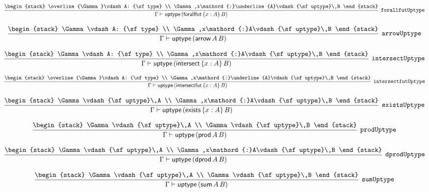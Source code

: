 \[
\infer[{\tt forallfutUptype}]{\Gamma \vdash {\sf uptype}\,({\sf forallfut}\,\{x : A\}\,B)}{
\begin{stack}
\overline{\Gamma}\vdash A: {\sf type}
\\
\Gamma ,x\mathord{:}\underline{A}\vdash {\sf uptype}\,B
\end{stack}}
\]

\[
\infer[{\tt arrowUptype}]{\Gamma \vdash {\sf uptype}\,({\sf arrow}\,A\,B)}{
\begin{stack}
\Gamma \vdash A: {\sf type}
\\
\Gamma ,x\mathord{:}A\vdash {\sf uptype}\,B
\end{stack}}
\]

\[
\infer[{\tt intersectUptype}]{\Gamma \vdash {\sf uptype}\,({\sf intersect}\,\{x : A\}\,B)}{
\begin{stack}
\Gamma \vdash A: {\sf type}
\\
\Gamma ,x\mathord{:}A\vdash {\sf uptype}\,B
\end{stack}}
\]

\[
\infer[{\tt intersectfutUptype}]{\Gamma \vdash {\sf uptype}\,({\sf intersectfut}\,\{x : A\}\,B)}{
\begin{stack}
\overline{\Gamma}\vdash A: {\sf type}
\\
\Gamma ,x\mathord{:}\underline{A}\vdash {\sf uptype}\,B
\end{stack}}
\]

\[
\infer[{\tt existsUptype}]{\Gamma \vdash {\sf uptype}\,({\sf exists}\,\{x : A\}\,B)}{
\begin{stack}
\Gamma \vdash {\sf uptype}\,A
\\
\Gamma ,x\mathord{:}A\vdash {\sf uptype}\,B
\end{stack}}
\]

\[
\infer[{\tt prodUptype}]{\Gamma \vdash {\sf uptype}\,({\sf prod}\,A\,B)}{
\begin{stack}
\Gamma \vdash {\sf uptype}\,A
\\
\Gamma \vdash {\sf uptype}\,B
\end{stack}}
\]

\[
\infer[{\tt dprodUptype}]{\Gamma \vdash {\sf uptype}\,({\sf dprod}\,A\,B)}{
\begin{stack}
\Gamma \vdash {\sf uptype}\,A
\\
\Gamma ,x\mathord{:}A\vdash {\sf uptype}\,B
\end{stack}}
\]

\[
\infer[{\tt sumUptype}]{\Gamma \vdash {\sf uptype}\,({\sf sum}\,A\,B)}{
\begin{stack}
\Gamma \vdash {\sf uptype}\,A
\\
\Gamma \vdash {\sf uptype}\,B
\end{stack}}
\]

